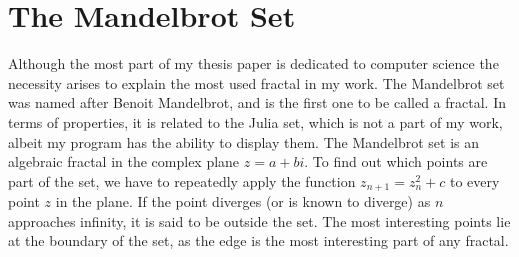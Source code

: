 \documentclass[10pt,a4paper,titlepage]{article}
\begin{document}
	
	
	\section{The Mandelbrot Set}
	Although the most part of my thesis paper is dedicated to computer science the necessity arises to explain the most used fractal in my work. The Mandelbrot set was named after Benoit Mandelbrot, and is the first one to be called a fractal. In terms of properties, it is related to the Julia set, which is not a part of my work, albeit my program has the ability to display them. The Mandelbrot set is an algebraic fractal in the complex plane \(z = a + b i\). To find out which points are part of the set, we have to repeatedly apply the function \(z_{n+1} = z_{n}^2 + c\) to every point \(z\) in the plane. If the point diverges (or is known to diverge) as \(n\) approaches infinity, it is said to be outside the set. The most interesting points lie at the boundary of the set, as the edge is the most interesting part of any fractal.
	
\end{document}
